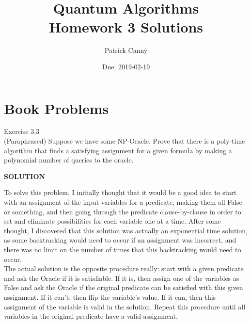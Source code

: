 \documentclass{exam} %
\theoremstyle{plain}
\theoremstyle{definition}
\theoremstyle{remark}
\numberwithin{equation}{section}  %
\newcommand{\sol}{\begin{center}\textbf{SOLUTION}\end{center}}
\begin{document}
\title{Quantum Algorithms \\ Homework 3 Solutions}
\author{Patrick Canny}
\date{Due: 2019-02-19}
\maketitle
\section{Book Problems}
\begin{questions}
  \question Exercise 3.3\\
  (Paraphrased)
  Suppose we have some NP-Oracle. Prove that there is a poly-time algorithm that
  finds a satisfying assignment for a given formula by making a polynomial number
  of queries to the oracle.\\
  \sol
  To solve this problem, I initially thought that it would be a good idea to start
  with an assignment of the input variables for a predicate, making them all False
  or something, and then going through the predicate clause-by-clause in order to 
  set and eliminate possibilities for each variable one at a time. After some thought,
  I discovered that this solution was actually an exponential time solution, as 
  some backtracking would need to occur if an assignment was incorrect, and there was
  no limit on the number of times that this backtracking would need to occur.\\

  The actual solution is the opposite procedure really: start with a given 
  predicate and ask the Oracle if it is satisfiable. If it is, then assign one of
  the variables as False and ask the Oracle if the original predicate can be
  satisfied with this given assignment. If it can't, then flip the variable's 
  value. If it can, then this assignment of the variable  is valid in the solution. 
  Repeat this procedure until all variables in the original predicate have a 
  valid assignment.\\


\end{questions}
\end{document}
